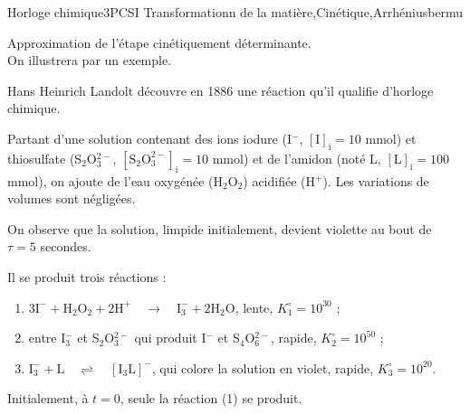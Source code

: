 
\begin{exercise}{Horloge chimique}{3}{PCSI}
{Transformationn de la matière,Cinétique,Arrhénius}{bermu}

\begin{questions}
\questioncours Approximation de l’étape cinétiquement déterminante. \\ On illustrera par un exemple.

\begin{EnvUplevel}
     Hans Heinrich Landolt découvre en 1886 une réaction qu'il qualifie d'horloge chimique.
     
     Partant d'une solution contenant des ions iodure (I$^-$, $\mathrm{[I]_i} = 10$ mmol) et thiosulfate (S$_2$O$_3^{2-}$, $\mathrm{[S_2O_3^{2-}]_i} = 10$ mmol) et de l'amidon (noté L, $\mathrm{[L]_i} = 100$ mmol), on ajoute de l'eau oxygénée (H$_2$O$_2$) acidifiée (H$^+$). Les variations de volumes sont négligées.
     
     On observe que la solution, limpide initialement, devient violette au bout de $\tau = 5$ secondes.
     
     Il se produit trois réactions :
     \begin{enumerate}[~\quad(1)]
         \item $\mathrm{3 I^- + H_2O_2 + 2 H^+ \quad\longrightarrow\quad I_3^- + 2 H_2O}$, lente, $K^\circ_1 = 10^{30}$ ;
         \item entre I$_3^-$ et S$_2$O$_3^{2-}$ qui produit I$^-$ et S$_4$O$_6^{2-}$, rapide, $K^\circ_2 = 10^{50}$ ;
         \item $\mathrm{I_3^- + L \quad\rightleftharpoons\quad [I_3L]^-}$, qui colore la solution en violet, rapide, $K^\circ_3 = 10^{20}$.
     \end{enumerate}
\end{EnvUplevel}

\question Initialement, à $t=0$, seule la réaction (1) se produit.
\end{questions}
\end{exercise}
